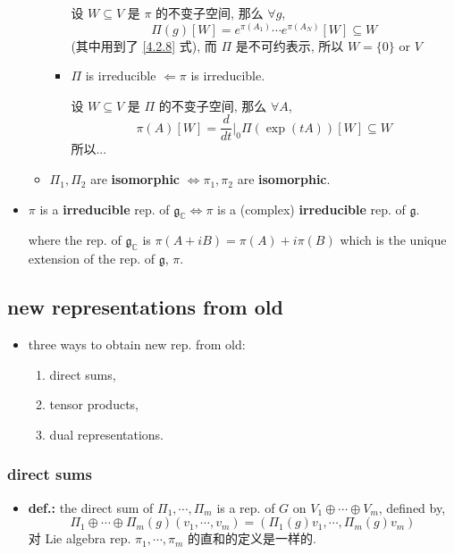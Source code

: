 \begin{itemize}
\begin{itemize}
\begin{tcolorbox}[title=proof:]
\begin{itemize}
				设 $W \subseteq V$ 是 $\pi$ 的不变子空间, 那么 $\forall g$,
				\begin{equation}
					\Pi(g)[W] = e^{\pi(A_1)} \cdots e^{\pi(A_N)}[W] \subseteq W
				\end{equation}
				(其中用到了 \eqref{4.2.8} 式), 而 $\Pi$ 是不可约表示, 所以 $W = \{0\}$ or $V$
				
				\item $\Pi$ is irreducible $\Longleftarrow \pi$ is irreducible.
				
				设 $W \subseteq V$ 是 $\Pi$ 的不变子空间, 那么 $\forall A$,
				\begin{equation}
					\pi(A)[W] = \frac{d}{dt} \Big|_0 \Pi(\exp(t A))[W] \subseteq W
				\end{equation}
				所以...
			\end{itemize}
		\end{tcolorbox}
		
		\item $\Pi_1, \Pi_2$ are \textbf{isomorphic} $\iff \pi_1, \pi_2$ are \textbf{isomorphic}.
	\end{itemize}
	
	\item $\pi$ is a \textbf{irreducible} rep. of $\mathfrak{g}_\mathbb{C} \iff \pi$ is a (complex) \textbf{irreducible} rep. of $\mathfrak{g}$.
	
	where the rep. of $\mathfrak{g}_\mathbb{C}$ is $\pi(A + i B) = \pi(A) + i \pi(B)$ which is the unique extension of the rep. of $\mathfrak{g}$, $\pi$.
\end{itemize}

\subsection{new representations from old}
\begin{itemize}
	\item three ways to obtain new rep. from old:
	\begin{enumerate}
		\item direct sums,
		
		\item tensor products,
		
		\item dual representations.
	\end{enumerate}
\end{itemize}

\subsubsection{direct sums}
\begin{itemize}
	\item \textbf{def.:} the direct sum of $\Pi_1, \cdots, \Pi_m$ is a rep. of $G$ on $V_1 \oplus \cdots \oplus V_m$, defined by,
	\begin{equation}
		\Pi_1 \oplus \cdots \oplus \Pi_m(g)(v_1, \cdots, v_m) = (\Pi_1(g) v_1, \cdots, \Pi_m(g) v_m)
	\end{equation}
	对 Lie algebra rep. $\pi_1, \cdots, \pi_m$ 的直和的定义是一样的.
\end{itemize}

